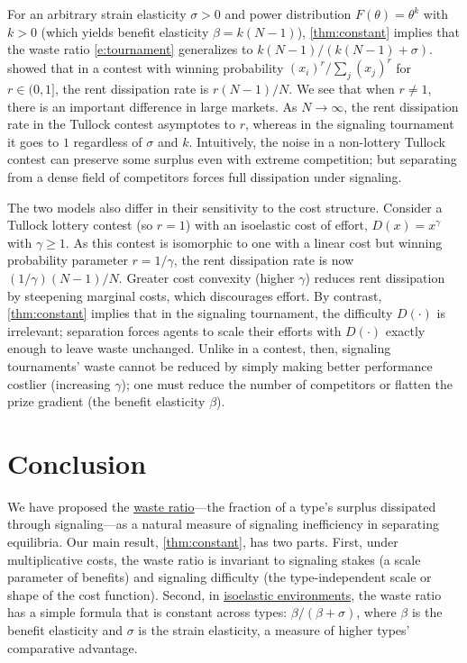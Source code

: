 \documentclass[12 pt]{article}
\theoremstyle{remark}
\theoremstyle{definition}
\begin{document}
For an arbitrary strain elasticity $\sigma>0$ and power distribution $F(\theta)=\theta^k$ with $k>0$ (which yields benefit elasticity $\beta=k(N-1)$), \autoref{thm:constant} implies that the waste ratio \eqref{e:tournament} generalizes to \mbox{$k(N-1) /(k(N-1)+\sigma)$}. \citet{Tullock80} showed that in a contest with winning probability $(x_i)^r / \sum_j (x_j)^r$ for $r\in (0,1]$, the rent dissipation rate is $r(N-1)/N$.  We see that when $r\neq 1$, there is an important difference in large markets. As $N\to \infty$, the rent dissipation rate in the Tullock contest asymptotes to $r$, whereas in the signaling tournament it goes to $1$ regardless of $\sigma$ and $k$. Intuitively, the noise in a non-lottery Tullock contest can preserve some surplus even with extreme competition; but separating from a dense field of competitors forces full dissipation under signaling. 

The two models also differ in their sensitivity to the cost structure. Consider a Tullock lottery contest (so $r=1$) with an isoelastic cost of effort, $D(x) = x^\gamma$ with $\gamma \ge 1$. As this contest is isomorphic to one with a linear cost but winning probability parameter $r=1/\gamma$, the rent dissipation rate is now $(1/\gamma)(N-1)/N$. Greater cost convexity (higher $\gamma$) reduces rent dissipation by steepening marginal costs, which discourages effort. %
By contrast, \autoref{thm:constant} implies that in the signaling tournament, the difficulty $D(\cdot)$ is irrelevant; separation forces agents to scale their efforts with $D(\cdot)$ exactly enough to leave waste unchanged. Unlike in a contest, then, signaling tournaments' waste cannot be reduced by simply making better performance costlier (increasing $\gamma$); one must reduce the number of competitors or flatten the prize gradient (the benefit elasticity $\beta$).

\section{Conclusion}
\label{sec:conclusion}

We have proposed the \hyperref[def:waste]{waste ratio}---the fraction of a type's surplus dissipated through signaling---as a natural measure of signaling inefficiency in separating equilibria. 
Our main result, \autoref{thm:constant}, has two parts. First, under multiplicative costs, the waste ratio is invariant to signaling stakes (a scale parameter of benefits) and signaling difficulty (the type-independent scale or shape of the cost function). Second, in \hyperref[def:isoelastic]{isoelastic environments}, the waste ratio has a simple formula that is constant across types: 
$\beta/(\beta + \sigma)$, where $\beta$ is the benefit elasticity and $\sigma$ is the strain elasticity, a measure of higher types' comparative advantage. 
\end{document}
